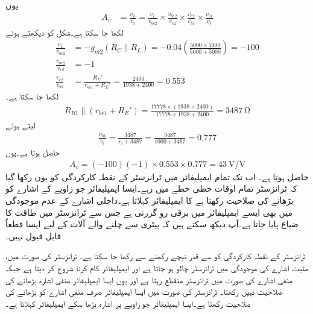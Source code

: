یوں
\begin{align*}
A_v&=\frac{v_L}{v_i}=\frac{v_L}{v_{be2}} \times   \frac{v_{be2}}{v_{e2}} \times   \frac{v_{e2}}{v_{b1}} \times \frac{v_{b1}}{v_i}
\end{align*}
لکھا جا سکتا ہے۔شکل کو دیکھتے ہوئے
\begin{align*}
\frac{v_L}{v_{be2}}&=-g_{m2} \left(R_C \mathbin{\|} R_L \right)=-0.04 \left(\frac{5000 \times 5000}{5000+5000} \right)=-100\\
\frac{v_{be2}}{v_{e2}}&=-1\\
\frac{v_{e2}}{v_{b1}}&=\frac{R_E'}{r_{be1}+R_E'}=\frac{2400}{1938+2400}=0.553
\end{align*}
لکھا جا سکتا ہے۔
\begin{align*}
R_{B1} \mathbin{\|} \left(r_{be1}+R_E' \right)=\frac{17778 \times \left(1938+2400 \right)}{17778+1938+2400}=\SI{3487}{\ohm}
\end{align*}
لیتے ہوئے
\begin{align*}
\frac{v_{b1}}{v_i}=\frac{3487}{r_i+3487}=\frac{3487}{1000+3487}=0.777
\end{align*}
حاصل ہوتا ہے۔یوں
\begin{align*}
A_v=(-100)(-1) \times 0.553 \times 0.777=\SI{43}{\volt \per \volt}
\end{align*}
حاصل ہوتا ہے۔
اب تک تمام ایمپلیفائر میں ٹرانزسٹر کے نقطہ کارکردگی کو یوں  رکھا گیا کہ ٹرانزسٹر تمام اوقات خطی خطے میں رہے۔ایسا ایمپلیفائر جو  زاویے کے اشارے کو بڑھانے کی صلاحیت رکھتا ہے   کا ایمپلیفائر کہلاتا  ہے۔داخلی اشارے کے عدم موجودگی میں بھی ایسے ایمپلیفائر میں  برقی رو گزرتی ہے جس سے ٹرانزسٹر میں  طاقت کا ضیاع پایا جاتا ہے۔آپ دیکھ سکتے ہیں کہ بیٹری سے چلنے والے آلات کے لیے ایسا قطعاً  قابل قبول نہیں۔

ٹرانزسٹر کے نقطہ کارکردگی کو   سے قدر نیچے رکھنے سے   رکھا جا سکتا ہے۔ ٹرانزسٹر کی صورت میں، مثبت اشارے کی موجودگی میں  ٹرانزسٹر چالو ہو جاتا ہے اور ایمپلیفائر کام کرنا شروع کر دیتا ہے جبکہ منفی اشارے کی صورت میں ٹرانزسٹر منقطع  رہتا ہے اور یوں ایسا ایمپلیفائر منفی اشارہ  بڑھانے کی صلاحیت نہیں رکھتا۔ ٹرانزسٹر کی صورت  میں ایسا ایمپلیفائر صرف منفی اشارے کو بڑھانے کی صلاحیت رکھتا ہے۔ایسا ایمپلیفائر جو  زاویے پر اشارہ بڑھا سکے  ایمپلیفائر کہلاتا ہے۔

